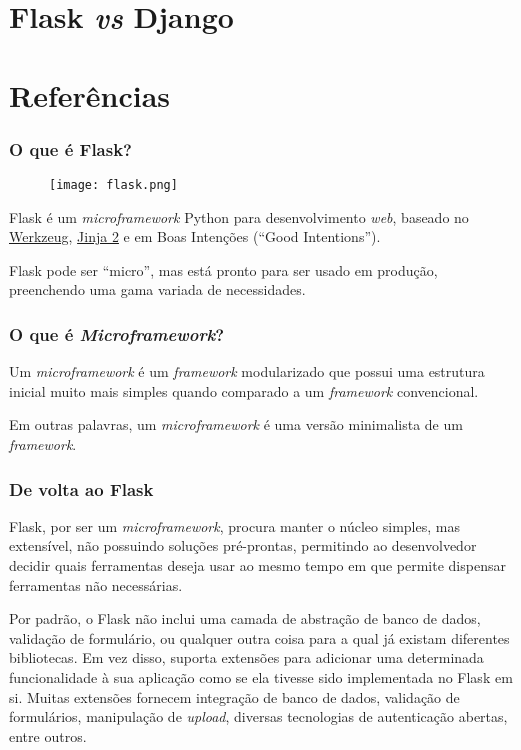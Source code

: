 \documentclass[t]{beamer}
\begin{document}
\section{Flask \textit{vs} Django}
\section{Referências}

\begin{frame}
	\frametitle{O que é Flask?}
	\begin{figure}[!ht]
		\centering
		\texttt{[image: flask.png]}
	\end{figure}
	
	Flask é um \textit{microframework} Python para desenvolvimento \textit{web}, baseado no  \href{https://werkzeug.palletsprojects.com/en/2.0.x/}{Werkzeug}, \href{https://jinja.palletsprojects.com/en/3.0.x/}{Jinja 2} e em Boas Intenções (``Good Intentions'').
	\vspace{1cm}
  
	Flask pode ser ``micro'', mas está pronto para ser usado em produção, preenchendo uma gama variada de necessidades.
\end{frame}

\begin{frame}
	\frametitle{O que é \textit{Microframework}?}
	Um \textit{microframework} é um \textit{framework} modularizado que possui uma estrutura inicial muito mais simples quando comparado a um \textit{framework} convencional. 
	\vspace{.5cm}
	
	Em outras palavras, um \textit{microframework} é uma versão minimalista de um \textit{framework}.
\end{frame}

\begin{frame}
	\frametitle{De volta ao Flask}
	Flask, por ser um \textit{microframework}, procura manter o núcleo simples, mas extensível, não possuindo soluções pré-prontas, permitindo ao desenvolvedor decidir quais ferramentas deseja usar ao mesmo tempo em que permite dispensar ferramentas não necessárias.
	\vspace{.5cm}
	
	Por padrão, o Flask não inclui uma camada de abstração de banco de dados, validação de formulário, ou qualquer outra coisa para a qual já existam diferentes bibliotecas. Em vez disso, suporta extensões para adicionar uma determinada funcionalidade à sua aplicação como se ela tivesse sido implementada no Flask em si. Muitas extensões fornecem integração de banco de dados, validação de formulários, manipulação de \textit{upload}, diversas tecnologias de autenticação abertas, entre outros.
\end{frame}
\end{document}
